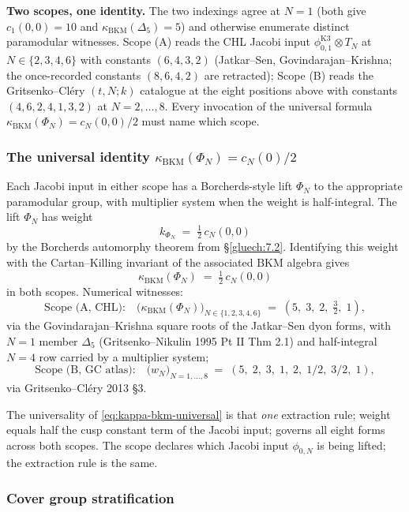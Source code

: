 \textbf{Two scopes, one identity.} The two indexings agree at $N = 1$ (both give $c_1(0,0) = 10$ and $\kappa_{\mathrm{BKM}}(\Delta_5) = 5$) and otherwise enumerate distinct paramodular witnesses. Scope (A) reads the CHL Jacobi input $\phi_{0,1}^{\mathrm{K3}} \otimes T_N$ at $N \in \{2, 3, 4, 6\}$ with constants $(6, 4, 3, 2)$ (Jatkar--Sen, Govindarajan--Krishna; the once-recorded constants $(8, 6, 4, 2)$ are retracted); Scope (B) reads the Gritsenko--Cl\'ery $(t, N; k)$ catalogue at the eight positions above with constants $(4, 6, 2, 4, 1, 3, 2)$ at $N = 2, \ldots, 8$. Every invocation of the universal formula $\kappa_{\mathrm{BKM}}(\Phi_N) = c_N(0, 0)/2$ must name which scope.

\subsubsection{The universal identity $\kappa_{\mathrm{BKM}}(\Phi_N) = c_N(0)/2$}

Each Jacobi input in either scope has a Borcherds-style lift $\Phi_N$
to the appropriate paramodular group, with multiplier system when the
weight is half-integral. The lift $\Phi_N$ has weight
\[
 k_{\Phi_N} \;=\; \tfrac12 \, c_N(0, 0)
\]
by the Borcherds automorphy theorem from \S\ref{gluech:7.2}. Identifying this weight with the Cartan--Killing invariant of the associated BKM algebra gives
\begin{equation}
 \kappa_{\mathrm{BKM}}(\Phi_N) \;=\; \tfrac12 \, c_N(0, 0)
 \label{eq:kappa-bkm-universal}
\end{equation}
in both scopes. Numerical witnesses:
\[
 \text{Scope (A, CHL):}\quad \bigl(\kappa_{\mathrm{BKM}}(\Phi_N)\bigr)_{N \in \{1, 2, 3, 4, 6\}} \;=\; (5, \; 3, \; 2, \; \tfrac32, \; 1),
\]
via the Govindarajan--Krishna square roots of the Jatkar--Sen dyon forms, with $N = 1$ member $\Delta_5$ (Gritsenko--Nikulin 1995 Pt II Thm 2.1) and half-integral $N = 4$ row carried by a multiplier system;
\[
 \text{Scope (B, GC atlas):}\quad \bigl(w_N\bigr)_{N = 1, \ldots, 8} \;=\; (5, \; 2, \; 3, \; 1, \; 2, \; 1/2, \; 3/2, \; 1),
\]
via Gritsenko--Cl\'ery 2013 \S 3.

\noindent The universality of \eqref{eq:kappa-bkm-universal} is that \emph{one} extraction rule; weight equals half the cusp constant term of the Jacobi input; governs all eight forms across both scopes. The scope declares which Jacobi input $\phi_{0, N}$ is being lifted; the extraction rule is the same.

\subsubsection{Cover group stratification}

